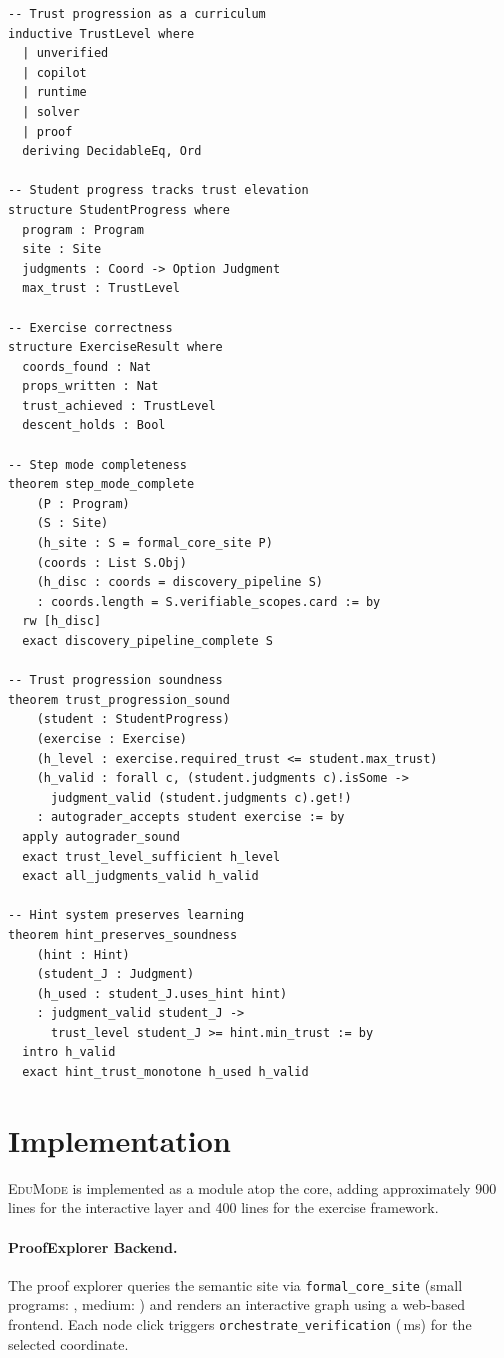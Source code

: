 \documentclass[11pt]{article}
\newcommand{\EduMode}{\textsc{EduMode}}
\begin{document}
\begin{lstlisting}[language=lean,basicstyle=\small\ttfamily,
  keywordstyle=\bfseries,frame=single,xleftmargin=1em]
-- Trust progression as a curriculum
inductive TrustLevel where
  | unverified
  | copilot
  | runtime
  | solver
  | proof
  deriving DecidableEq, Ord

-- Student progress tracks trust elevation
structure StudentProgress where
  program : Program
  site : Site
  judgments : Coord -> Option Judgment
  max_trust : TrustLevel

-- Exercise correctness
structure ExerciseResult where
  coords_found : Nat
  props_written : Nat
  trust_achieved : TrustLevel
  descent_holds : Bool

-- Step mode completeness
theorem step_mode_complete
    (P : Program)
    (S : Site)
    (h_site : S = formal_core_site P)
    (coords : List S.Obj)
    (h_disc : coords = discovery_pipeline S)
    : coords.length = S.verifiable_scopes.card := by
  rw [h_disc]
  exact discovery_pipeline_complete S

-- Trust progression soundness
theorem trust_progression_sound
    (student : StudentProgress)
    (exercise : Exercise)
    (h_level : exercise.required_trust <= student.max_trust)
    (h_valid : forall c, (student.judgments c).isSome ->
      judgment_valid (student.judgments c).get!)
    : autograder_accepts student exercise := by
  apply autograder_sound
  exact trust_level_sufficient h_level
  exact all_judgments_valid h_valid

-- Hint system preserves learning
theorem hint_preserves_soundness
    (hint : Hint)
    (student_J : Judgment)
    (h_used : student_J.uses_hint hint)
    : judgment_valid student_J ->
      trust_level student_J >= hint.min_trust := by
  intro h_valid
  exact hint_trust_monotone h_used h_valid
\end{lstlisting}

\section{Implementation}\label{sec:implementation}

\EduMode{} is implemented as a \Python{} module atop the \JuGeo{} core,
adding approximately 900 lines for the interactive layer and 400 lines for
the exercise framework.

\paragraph{ProofExplorer Backend.}
The proof explorer queries the semantic site via \texttt{formal\_core\_site}
(small programs: \subFormalcoresiteSmallTime{}, medium:
\subFormalcoresiteMediumTime{}) and renders an interactive graph using a
web-based frontend. Each node click triggers \texttt{orchestrate\_verification}
(\compProfOrchestrateVerificationMeanMs{}\,ms) for the selected coordinate.
\end{document}
